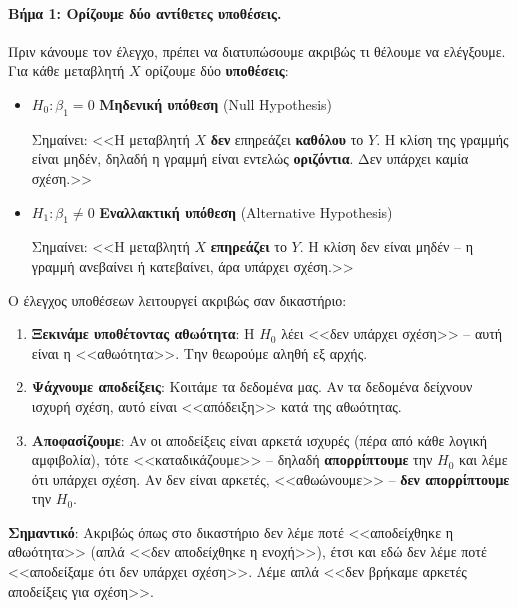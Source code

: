 \documentclass[12pt,a4paper]{article}
\begin{document}
\paragraph{Βήμα 1: Ορίζουμε δύο αντίθετες υποθέσεις.}

Πριν κάνουμε τον έλεγχο, πρέπει να διατυπώσουμε ακριβώς τι θέλουμε να ελέγξουμε. Για κάθε μεταβλητή $X$ ορίζουμε δύο \textbf{υποθέσεις}:

\begin{theorybox}
\begin{itemize}
    \item $H_0: \beta_1 = 0$ \quad \textbf{Μηδενική υπόθεση} (Null Hypothesis)

    Σημαίνει: <<Η μεταβλητή $X$ \textbf{δεν} επηρεάζει \textbf{καθόλου} το $Y$. Η κλίση της γραμμής είναι μηδέν, δηλαδή η γραμμή είναι εντελώς \textbf{οριζόντια}. Δεν υπάρχει καμία σχέση.>>

    \item $H_1: \beta_1 \neq 0$ \quad \textbf{Εναλλακτική υπόθεση} (Alternative Hypothesis)

    Σημαίνει: <<Η μεταβλητή $X$ \textbf{επηρεάζει} το $Y$. Η κλίση δεν είναι μηδέν -- η γραμμή ανεβαίνει ή κατεβαίνει, άρα υπάρχει σχέση.>>
\end{itemize}
\end{theorybox}

\begin{examplebox}
Ο έλεγχος υποθέσεων λειτουργεί ακριβώς σαν δικαστήριο:

\begin{enumerate}
    \item \textbf{Ξεκινάμε υποθέτοντας αθωότητα}: Η $H_0$ λέει <<δεν υπάρχει σχέση>> -- αυτή είναι η <<αθωότητα>>. Την θεωρούμε αληθή εξ αρχής.

    \item \textbf{Ψάχνουμε αποδείξεις}: Κοιτάμε τα δεδομένα μας. Αν τα δεδομένα δείχνουν ισχυρή σχέση, αυτό είναι <<απόδειξη>> κατά της αθωότητας.

    \item \textbf{Αποφασίζουμε}: Αν οι αποδείξεις είναι αρκετά ισχυρές (πέρα από κάθε λογική αμφιβολία), τότε <<καταδικάζουμε>> -- δηλαδή \textbf{απορρίπτουμε} την $H_0$ και λέμε ότι υπάρχει σχέση. Αν δεν είναι αρκετές, <<αθωώνουμε>> -- \textbf{δεν απορρίπτουμε} την $H_0$.
\end{enumerate}

\textbf{Σημαντικό}: Ακριβώς όπως στο δικαστήριο δεν λέμε ποτέ <<αποδείχθηκε η αθωότητα>> (απλά <<δεν αποδείχθηκε η ενοχή>>), έτσι και εδώ δεν λέμε ποτέ <<αποδείξαμε ότι δεν υπάρχει σχέση>>. Λέμε απλά <<δεν βρήκαμε αρκετές αποδείξεις για σχέση>>.
\end{examplebox}
\end{document}
